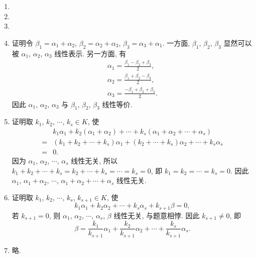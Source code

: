 \documentclass[a4paper, 11pt]{ctexart}
\begin{document}
    \begin{enumerate}
        \item %
        \item %
        \item %
        \item %
            {\heiti 证明}\quad 令 $\beta_1 = \alpha_1 + \alpha_2$, $\beta_2 = \alpha_2 + \alpha_3$, $\beta_3 = \alpha_3 + \alpha_1$.
            一方面, $\beta_1$, $\beta_2$, $\beta_3$ 显然可以被 $\alpha_1$, $\alpha_2$, $\alpha_3$ 线性表示.
            另一方面, 有
            \begin{gather*}
                \alpha_1 = \frac{\beta_1 - \beta_2 + \beta_3}{2}, \\
                \alpha_2 = \frac{\beta_1 + \beta_2 - \beta_3}{2}, \\
                \alpha_3 = \frac{-\beta_1 + \beta_2 + \beta_3}{2}.
            \end{gather*}
            因此 $\alpha_1$, $\alpha_2$, $\alpha_3$ 与 $\beta_1$, $\beta_2$, $\beta_3$ 线性等价.
        \item %
            {\heiti 证明}\quad 取 $k_1$, $k_2$, $\cdots$, $k_s \in K$, 使
            \begin{align*}
                    & k_1\alpha_1 + k_2(\alpha_1 + \alpha_2) + \cdots + k_s(\alpha_1 + \alpha_2 + \cdots + \alpha_s) \\
                ={} & (k_1 + k_2 + \cdots + k_s)\alpha_1 + (k_2 + \cdots + k_s)\alpha_2 + \cdots + k_s\alpha_s \\
                ={} & 0.    
            \end{align*}
            因为 $\alpha_1$, $\alpha_2$, $\cdots$, $\alpha_s$ 线性无关, 所以 $k_1 + k_2 + \cdots + k_s = k_2 + \cdots + k_s = \cdots = k_s = 0$,
            即 $k_1 = k_2 = \cdots = k_s = 0$. 因此 $\alpha_1$, $\alpha_1 + \alpha_2$, $\cdots$, $\alpha_1 + \alpha_2 + \cdots + \alpha_s$ 线性无关.
        \item %
            {\heiti 证明}\quad 取 $k_1$, $k_2$, $\cdots$, $k_s$, $k_{s+1} \in K$, 使
            \[
                k_1\alpha_1 + k_2\alpha_2 + \cdots + k_s\alpha_s + k_{s+1}\beta = 0,    
            \]
            若 $k_{s+1} = 0$, 则 $\alpha_1$, $\alpha_2$, $\cdots$, $\alpha_s$, $\beta$ 线性无关, 与题意相悖. 因此 $k_{s+1} \neq 0$, 即
            \[
                \beta = \frac{k_1}{k_{s+1}}\alpha_1 + \frac{k_2}{k_{s+1}}\alpha_2 + \cdots + \frac{k_s}{k_{s+1}}\alpha_s.    
            \]
        \item %
            略.

\end{enumerate}
\end{document}
